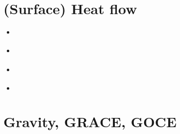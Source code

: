\section{(Surface) Heat flow}
\begin{scriptsize}
\begin{itemize}
\item[\nineteensixtyseven] 
\textcite{mcke67} 
\item[\nineteenninetynine] 
\textcite{dudf99} 
\item[\twothousandten] 
\textcite{dada10} 
\item[\twothousandtwenty]
\textcite{moku20} 
\end{itemize}
\end{scriptsize}

\section{Gravity, GRACE, GOCE}

